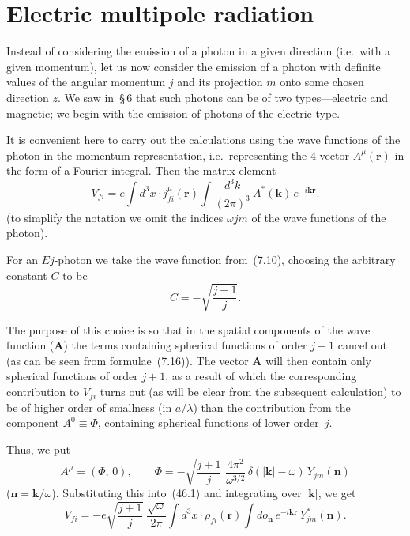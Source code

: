 \section{Electric multipole radiation}

Instead of considering the emission of a photon in a given direction (i.e.\ with a given momentum), let us now consider the emission of a photon with definite values of the angular momentum $j$ and its projection $m$ onto some chosen direction $z$. We saw in~\S\,6 that such photons can be of two types---electric and magnetic; we begin with the emission of photons of the electric type.

It is convenient here to carry out the calculations using the wave functions of the photon in the momentum representation, i.e.\ representing the 4-vector $A^\mu(\mathbf{r})$ in the form of a Fourier integral. Then the matrix element
\begin{equation}
V_{fi} = e\int d^3x\cdot j^\mu_{fi}(\mathbf{r})\int\frac{d^3k}{(2\pi)^3}\,A^*(\mathbf{k})\,e^{-i\mathbf{k}\mathbf{r}}.
\tag{46.1}
\end{equation}
(to simplify the notation we omit the indices $\omega jm$ of the wave functions of the photon).

For an $Ej$-photon we take the wave function from~(7.10), choosing the arbitrary constant $C$ to be
\[
C = -\sqrt{\frac{j+1}{j}}.
\]

The purpose of this choice is so that in the spatial components of the wave function ($\mathbf{A}$) the terms containing spherical functions of order $j - 1$ cancel out (as can be seen from formulae~(7.16)). The vector $\mathbf{A}$ will then contain only spherical functions of order $j + 1$, as a result of which the corresponding contribution to $V_{fi}$ turns out (as will be clear from the subsequent calculation) to be of higher order of smallness (in $a/\lambda$) than the contribution from the component $A^0 \equiv \Phi$, containing spherical functions of lower order~$j$.

Thus, we put
\[
A^\mu = (\Phi,\,0),\qquad \Phi = -\sqrt{\frac{j+1}{j}}\;\frac{4\pi^2}{\omega^{3/2}}\,\delta(|\mathbf{k}| - \omega)\,Y_{jm}(\mathbf{n})
\]
($\mathbf{n} = \mathbf{k}/\omega$). Substituting this into~(46.1) and integrating over $|\mathbf{k}|$, we get
\begin{equation}
V_{fi} = -e\sqrt{\frac{j+1}{j}}\;\frac{\sqrt{\omega}}{2\pi}\int d^3x\cdot\rho_{fi}(\mathbf{r})\int do_\mathbf{n}\,e^{-i\mathbf{k}\mathbf{r}}\,Y^*_{jm}(\mathbf{n}).
\tag{46.2}
\end{equation}

